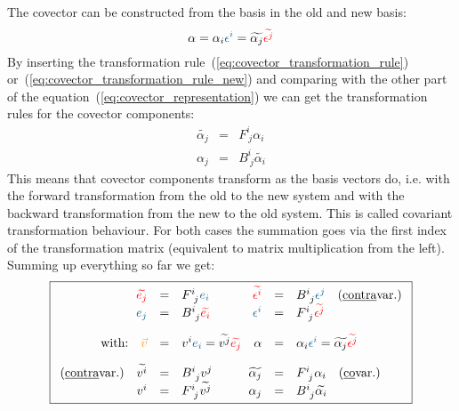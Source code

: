 The covector can be constructed from the basis in the old and new basis:
\begin{equation}
    \label{eq:covector_representation}
    \alpha = \alpha_i\hdcbvc{i} = \widetilde{\alpha_j}\hdcbtvc{j}
\end{equation}
By inserting the transformation rule~(\ref{eq:covector_transformation_rule})
or~(\ref{eq:covector_transformation_rule_new}) and comparing with the other part of the
equation~(\ref{eq:covector_representation}) we can get the transformation rules for the
covector components:
\begin{equation}
    \label{eq:covector_component_trafo}
    \begin{array}{rclrcl}
      \widetilde{\alpha_j} & = & F^{i~}_{~j}\alpha_i \\
      \alpha_j & = & B^{i~}_{~j}\widetilde{\alpha_i}
    \end{array}
  \end{equation}
  This means that covector components transform as the basis vectors do, i.e. with the
  forward transformation from the old to the new system and with the backward
  transformation from the new to the old system. This is called covariant transformation
  behaviour. For both cases the summation goes via the first index of the transformation
  matrix (equivalent to matrix multiplication from the left). \\

  Summing up everything so far we get:
  \begin{equation}
    \label{eq:summary_transformations}
    \boxed{
    \begin{array}{rclrcl}
      \hdbtvc{j} & = & F^{i~}_{~j}\hdbvc{i}
      \qquad \hfill
      \hdcbtvc{i} & = & B^{i~}_{~j} \hdcbvc{j}
      \quad\text{(\underline{contra}var.)} \\
      \hdbvc{j} & = & B^{i~}_{~j}\hdbtvc{i}
      \qquad\hfill
      \hdcbvc{i} & = &  F^{i~}_{~j} \hdcbtvc{j} \hfill \\
      \noalign{\vskip10pt}
      \text{with:}\quad \hdv & = & \hdvc{i} \hdbvc{i} = \hdtvc{j} \hdbtvc{j}
      \quad
      \alpha & = & \alpha_i\hdcbvc{i} = \widetilde{\alpha_j}\hdcbtvc{j}
      \hfill \\
      \noalign{\vskip10pt}
      \text{(\underline{contra}var.)}\quad
      \hdtvc{i} & = & B^{i~}_{~j} \hdvc{j}
      \qquad\hfill
      \widetilde{\alpha_j} & = & F^{i~}_{~j}\alpha_i
      \quad\text{(\underline{co}var.)}\hfill \\
      \hdvc{i} & = &  F^{i~}_{~j} \hdtvc{j}
      \qquad\hfill
      \alpha_j & = & B^{i~}_{~j}\widetilde{\alpha_i}\hfill
    \end{array}
    }
  \end{equation}

\newpage
